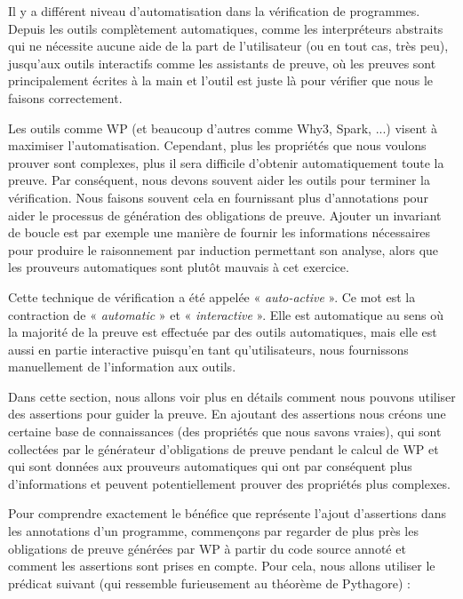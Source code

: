 Il y a différent niveau d'automatisation dans la vérification de programmes.
Depuis les outils complètement automatiques, comme les interpréteurs abstraits
qui ne nécessite aucune aide de la part de l'utilisateur (ou en tout cas, très peu),
jusqu'aux outils interactifs comme les assistants de preuve, où les preuves sont
principalement écrites à la main et l'outil est juste là pour vérifier que nous
le faisons correctement.


Les outils comme WP (et beaucoup d'autres comme Why3, Spark, ...) visent à
maximiser l'automatisation. Cependant, plus les propriétés que nous voulons
prouver sont complexes, plus il sera difficile d'obtenir automatiquement toute
la preuve. Par conséquent, nous devons souvent aider les outils pour terminer
la vérification. Nous faisons souvent cela en fournissant plus d'annotations
pour aider le processus de génération des obligations de preuve. Ajouter un
invariant de boucle est par exemple une manière de fournir les informations
nécessaires pour produire le raisonnement par induction permettant son analyse,
alors que les prouveurs automatiques sont plutôt mauvais à cet exercice.


Cette technique de vérification a été appelée « \textit{auto-active} ». Ce mot est la
contraction de « \textit{automatic} » et « \textit{interactive} ». Elle est automatique au sens
où la majorité de la preuve est effectuée par des outils automatiques, mais
elle est aussi en partie interactive puisqu'en tant qu'utilisateurs, nous
fournissons manuellement de l'information aux outils.


Dans cette section, nous allons voir plus en détails comment nous pouvons
utiliser des assertions pour guider la preuve. En ajoutant des assertions nous
créons une certaine base de connaissances (des propriétés que nous savons vraies),
qui sont collectées par le générateur d'obligations de preuve pendant le calcul
de WP et qui sont données aux prouveurs automatiques qui ont par conséquent plus
d'informations et peuvent potentiellement prouver des propriétés plus complexes.




Pour comprendre exactement le bénéfice que représente l'ajout d'assertions dans
les annotations d'un programme, commençons par regarder de plus près les
obligations de preuve générées par WP à partir du code source annoté et comment
les assertions sont prises en compte. Pour cela, nous allons utiliser le prédicat
suivant (qui ressemble furieusement au théorème de Pythagore) :



